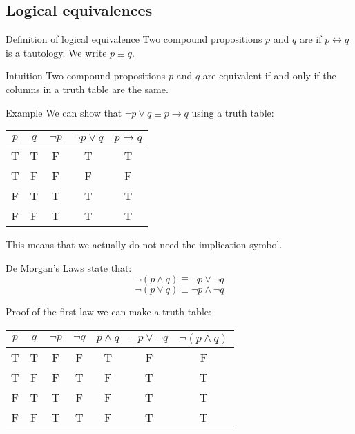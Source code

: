 \documentclass{article}
\begin{document}
\subsection{Logical equivalences}
\begin{parag}{Definition of logical equivalence}
    Two compound propositions $p$ and $q$ are  if $p \leftrightarrow q$ is a tautology. We write $p \equiv q$.

    \begin{subparag}{Intuition}
        Two compound propositions $p$ and $q$ are equivalent if and only if the columns in a truth table are the same.
    \end{subparag}
\end{parag}

\begin{parag}{Example}
    We can show that $\lnot p \lor q \equiv p \to q$ using a truth table:

    \begin{center}
    \begin{tabular}{c|c|c|c|c}
        $p$ & $q$ & $\lnot p$ & $\lnot p \lor q$ & $p \to q$ \\
        \hline
        T & T & F & T & T \\
        T & F & F & F & F \\
        F & T & T & T & T \\
        F & F & T & T & T \\
    \end{tabular}
    \end{center}

    This means that we actually do not need the implication symbol.
\end{parag}

\begin{parag}{De Morgan's Laws}
     state that: 
    \[\lnot\left(p \land q\right) \equiv \lnot p \lor \lnot q\]
    \[\lnot\left(p \lor q\right) \equiv \lnot p \land \lnot q\]

    \begin{subparag}{Proof of the first law}
        we can make a truth table:

        \begin{center}
        \begin{tabular}{c|c|c|c|c|c|c}
            $p$ & $q$ & $\lnot p$ & $\lnot q$ & $p \land q$ & $\lnot p \lor \lnot q$ & $\lnot\left(p \land q\right)$\\
            \hline
            T & T & F & F & T & F & F \\
            T & F & F & T & F & T & T \\
            F & T & T & F & F & T & T \\
            F & F & T & T & F & T & T \\
        \end{tabular}
        \end{center}
    \end{subparag}
\end{parag}
\end{document}

